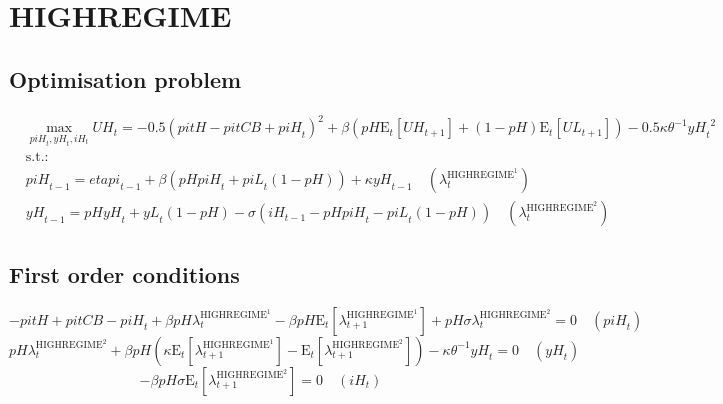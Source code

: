 

\section{HIGHREGIME}

\subsection{Optimisation problem}

\begin{align}
&\max_{{p\!i\!H}_{t}, {y\!H}_{t}, {i\!H}_{t}
} {U\!H}_{t} = -0.5\left({p\!i\!t\!H} - {p\!i\!t\!C\!B} + {p\!i\!H}_{t}\right)^{2} + {\beta} \left({{p\!H}} {\mathrm{E}_{t}\left[{U\!H}_{t+1}\right]} + \left(1 - {p\!H}\right) {\mathrm{E}_{t}\left[{U\!L}_{t+1}\right]}\right) - 0.5{\kappa} {\theta}^{-1} {{y\!H}_{t}}^{2}\\
&\mathrm{s.t.:}\nonumber\\
& {p\!i\!H}_{t-1} = {e\!t\!a\!p\!i}_{t-1} + {\beta} \left({{p\!H}} {{p\!i\!H}_{t}} + {{p\!i\!L}_{t}} \left(1 - {p\!H}\right)\right) + {\kappa} {{y\!H}_{t-1}} \quad \left(\lambda^{\mathrm{HIGHREGIME}^{\mathrm{1}}}_{t}\right)\\
& {y\!H}_{t-1} = {{p\!H}} {{y\!H}_{t}} + {{y\!L}_{t}} \left(1 - {p\!H}\right) - {\sigma} \left({i\!H}_{t-1} - {{p\!H}} {{p\!i\!H}_{t}} - {{p\!i\!L}_{t}} \left(1 - {p\!H}\right)\right) \quad \left(\lambda^{\mathrm{HIGHREGIME}^{\mathrm{2}}}_{t}\right)
\end{align}


\subsection{First order conditions}

\begin{equation}
-{p\!i\!t\!H} + {p\!i\!t\!C\!B} - {p\!i\!H}_{t} + {\beta} {{p\!H}} {\lambda^{\mathrm{HIGHREGIME}^{\mathrm{1}}}_{t}} - {\beta} {{p\!H}} {\mathrm{E}_{t}\left[\lambda^{\mathrm{HIGHREGIME}^{\mathrm{1}}}_{t+1}\right]} + {{p\!H}} {\sigma} {\lambda^{\mathrm{HIGHREGIME}^{\mathrm{2}}}_{t}} = 0
 \quad \left({p\!i\!H}_{t}\right)
\end{equation}
\begin{equation}
{{p\!H}} {\lambda^{\mathrm{HIGHREGIME}^{\mathrm{2}}}_{t}} + {\beta} {{p\!H}} \left({\kappa} {\mathrm{E}_{t}\left[\lambda^{\mathrm{HIGHREGIME}^{\mathrm{1}}}_{t+1}\right]} - \mathrm{E}_{t}\left[\lambda^{\mathrm{HIGHREGIME}^{\mathrm{2}}}_{t+1}\right]\right) - {\kappa} {\theta}^{-1} {{y\!H}_{t}} = 0
 \quad \left({y\!H}_{t}\right)
\end{equation}
\begin{equation}
-{\beta} {{p\!H}} {\sigma} {\mathrm{E}_{t}\left[\lambda^{\mathrm{HIGHREGIME}^{\mathrm{2}}}_{t+1}\right]} = 0
 \quad \left({i\!H}_{t}\right)
\end{equation}




